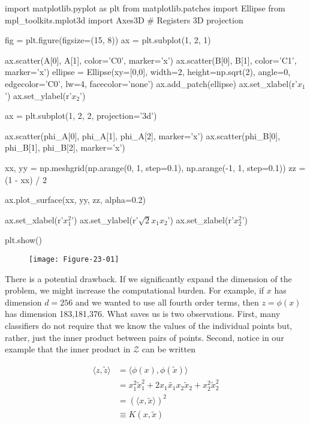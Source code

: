 \begin{python}
import matplotlib.pyplot as plt
from matplotlib.patches import Ellipse
from mpl_toolkits.mplot3d import Axes3D  # Registers 3D projection

fig = plt.figure(figsize=(15, 8))
ax = plt.subplot(1, 2, 1)

ax.scatter(A[0], A[1], color='C0', marker='x')
ax.scatter(B[0], B[1], color='C1', marker='x')
ellipse = Ellipse(xy=[0,0], width=2, height=np.sqrt(2), angle=0,
              edgecolor='C0', lw=4, facecolor='none')
ax.add_patch(ellipse)
ax.set_xlabel(r'$x_{1}$')
ax.set_ylabel(r'$x_{2}$')

ax = plt.subplot(1, 2, 2, projection='3d')

ax.scatter(phi_A[0], phi_A[1], phi_A[2], marker='x')
ax.scatter(phi_B[0], phi_B[1], phi_B[2], marker='x')

xx, yy = np.meshgrid(np.arange(0, 1, step=0.1), np.arange(-1, 1, step=0.1))
zz = (1 - xx) / 2

ax.plot_surface(xx, yy, zz, alpha=0.2)

ax.set_xlabel(r'$x_{1}^{2}$')
ax.set_ylabel(r'$\sqrt{2} x_{1} x_{2}$')
ax.set_zlabel(r'$x_{2}^{2}$')

plt.show()
\end{python}

\begin{figure}[H]
\centering
\texttt{[image: Figure-23-01]}
\end{figure}

There is a potential drawback. If we significantly expand the dimension
of the problem, we might increase the computational burden. For example,
if \(x\) has dimension \(d = 256\) and we wanted to use all fourth order
terms, then \(z = \phi(x)\) has dimension 183,181,376. What saves us is
two observations. First, many classifiers do not require that we know
the values of the individual points but, rather, just the inner product
between pairs of points. Second, notice in our example that the inner
product in \(\mathcal{Z}\) can be written

\begin{align*}
\langle z, \tilde{z} \rangle &= \langle \phi(x), \phi(\tilde{x}) \rangle \\
&= x_{1}^{2} \tilde{x}_{1}^{2} + 2 x_{1} \tilde{x_{1}} x_{2} \tilde{x}_{2} + x_{2}^{2} \tilde{x}_{2}^{2} \\
&= ( \langle x, \tilde{x} \rangle )^{2} \\
&\equiv K(x, \tilde{x})
\end{align*}

